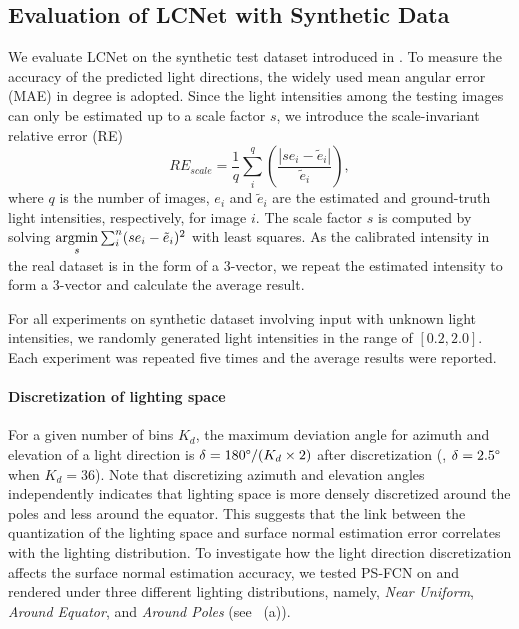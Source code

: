 \subsection{Evaluation of LCNet with Synthetic Data}
\label{sub:eval_lcnet}
We evaluate LCNet on the synthetic test dataset \syntestMERL introduced in .
To measure the accuracy of the predicted light directions, the widely used mean angular error (MAE) in degree is adopted.
Since the light intensities among the testing images can only be estimated up to a scale factor $s$, we introduce the scale-invariant relative error (RE)
\begin{equation}
    RE_{scale} = \frac{1}{q} \sum_i^q \left(\frac{|s e_i -\tilde{e}_i|}{\tilde{e}_i} \right),
\end{equation}
where $q$ is the number of images, $e_i$ and $\tilde{e}_i$ are the estimated and ground-truth light intensities, respectively, for image $i$. The scale factor $s$ is computed by solving \hbox{$\mathop{\mathrm{argmin}}\limits_s \sum_i^n (s e_i -\tilde{e}_i)^2$} with least squares. 
As the calibrated intensity in the real dataset is in the form of a $3$-vector, we repeat the estimated intensity to form a $3$-vector and calculate the average result.

For all experiments on synthetic dataset involving input with unknown light intensities, we randomly generated light intensities in the range of $[0.2, 2.0]$. Each experiment was repeated five times and the average results were reported.

\paragraph{Discretization of lighting space}
For a given number of bins $K_d$, the maximum deviation angle for azimuth and elevation of a light direction is $\delta = 180\degree/(K_d\times 2)$ after discretization (\eg, $\delta=2.5\degree$ when $K_d=36$).
Note that discretizing azimuth and elevation angles independently indicates that lighting space is more densely discretized around the poles and less around the equator. 
This suggests that the link between the quantization of the lighting space and surface normal estimation error correlates with the lighting distribution.
To investigate how the light direction discretization affects the surface normal estimation accuracy, we tested PS-FCN on  and  rendered under three different lighting distributions, namely, \textit{Near Uniform}, \textit{Around Equator}, and \textit{Around Poles} (see ~(a)).

